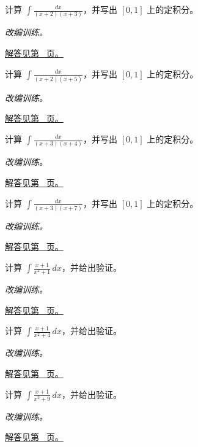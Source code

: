 \documentclass[UTF8,12pt,a4paper,fontset=fandol]{ctexart}
\begin{document}
\begin{example}[互异一次因子的部分分式]\label{ex:c13q15}
计算 $\displaystyle\int\frac{dx}{(x+2)(x+3)}$，并写出 $[0,1]$ 上的定积分。
\par\textit{改编训练。}\par\hyperref[ans:c13q15]{解答见第~\pageref{ans:c13q15} 页。}
\end{example}
\begin{example}[互异一次因子的部分分式]\label{ex:c13q16}
计算 $\displaystyle\int\frac{dx}{(x+2)(x+5)}$，并写出 $[0,1]$ 上的定积分。
\par\textit{改编训练。}\par\hyperref[ans:c13q16]{解答见第~\pageref{ans:c13q16} 页。}
\end{example}
\begin{example}[互异一次因子的部分分式]\label{ex:c13q17}
计算 $\displaystyle\int\frac{dx}{(x+3)(x+4)}$，并写出 $[0,1]$ 上的定积分。
\par\textit{改编训练。}\par\hyperref[ans:c13q17]{解答见第~\pageref{ans:c13q17} 页。}
\end{example}
\begin{example}[互异一次因子的部分分式]\label{ex:c13q18}
计算 $\displaystyle\int\frac{dx}{(x+3)(x+7)}$，并写出 $[0,1]$ 上的定积分。
\par\textit{改编训练。}\par\hyperref[ans:c13q18]{解答见第~\pageref{ans:c13q18} 页。}
\end{example}
\begin{example}[不可约二次因子的积分]\label{ex:c13q19}
计算 $\displaystyle\int\frac{x+1}{x^2+1}\,dx$，并给出验证。
\par\textit{改编训练。}\par\hyperref[ans:c13q19]{解答见第~\pageref{ans:c13q19} 页。}
\end{example}
\begin{example}[不可约二次因子的积分]\label{ex:c13q20}
计算 $\displaystyle\int\frac{x+1}{x^2+4}\,dx$，并给出验证。
\par\textit{改编训练。}\par\hyperref[ans:c13q20]{解答见第~\pageref{ans:c13q20} 页。}
\end{example}
\begin{example}[不可约二次因子的积分]\label{ex:c13q21}
计算 $\displaystyle\int\frac{x+1}{x^2+9}\,dx$，并给出验证。
\par\textit{改编训练。}\par\hyperref[ans:c13q21]{解答见第~\pageref{ans:c13q21} 页。}
\end{example}
\end{document}
